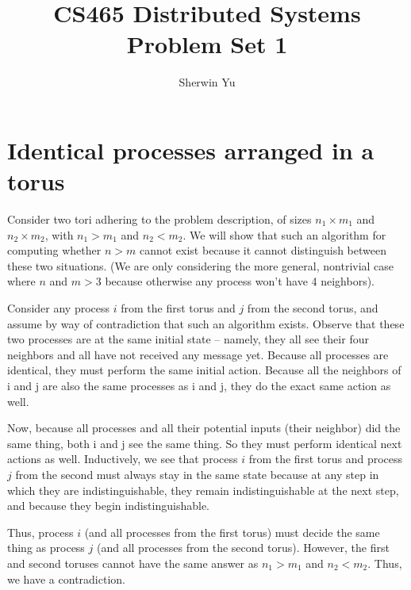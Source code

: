 \documentclass{article}
\begin{document}
\title{CS465 Distributed Systems Problem Set 1}
\author{Sherwin Yu}
\maketitle


\section{Identical processes arranged in a torus}
\label{problem1.1}
Consider two tori adhering to the problem description, of sizes $n_1 \times  m_1$ and $n_2 \times  m_2$, with $n_1 > m_1$ and $n_2 < m_2$. We will show that such an algorithm for
computing whether $n>m$ cannot exist because it cannot distinguish between these two situations. (We are only considering the more general, nontrivial case where $n$ and $m > 3$ because otherwise any
process won't have 4 neighbors).

Consider any process $i$ from the first torus and $j$ from the second torus, and assume by way of contradiction that such an algorithm exists.
Observe that these two processes are at the same initial state -- namely, they all see their four neighbors and all have not received any message yet. Because all processes are
identical, they must perform the same initial action.
Because all the neighbors of i and j are also the same processes as i and j, they do the exact same action as well.

Now, because all processes and all their potential inputs (their neighbor) did the same thing, both i and j see the same thing. So they must perform identical next actions as well.
Inductively, we see that process $i$ from the first torus and process $j$ from the second must always stay in the same state because at any step in which they are
indistinguishable, they remain indistinguishable at the next step, and because they begin indistinguishable.

Thus, process $i$ (and all processes from the first torus) must decide the same thing as process $j$ (and all processes from the second torus). However, the first and second
toruses cannot have the same answer as $n_1 > m_1$ and $n_2 < m_2$. Thus, we have a contradiction.
\end{document}
